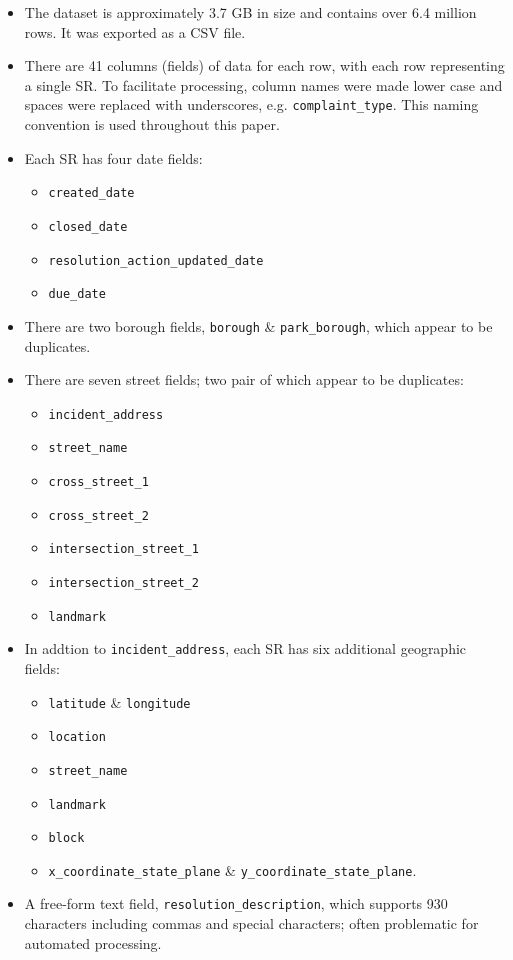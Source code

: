 \documentclass[linenumber]{jdsart}
\begin{document}
\begin{itemize}[left=1.5em]
\item The dataset is approximately 3.7 GB in size and contains 
  over 6.4 million rows. It was exported as a CSV file.

\item There are 41 columns (fields) of data for each row, with each
  row representing a single SR. To facilitate 
  processing, column names were made lower case and 
  spaces were replaced with underscores, e.g. \texttt{complaint\_type}. 
  This naming convention is used throughout this paper. 
	
\item Each SR has four date fields: 
	\begin{itemize}	
		\item{\texttt{created\_date}}
		\item{\texttt{closed\_date}}
		\item{\texttt{resolution\_action\_updated\_date}}
		\item{\texttt{due\_date}}
	\end{itemize}

\item There are two borough fields, \texttt{borough} \& \texttt{park\_borough}, 
		which appear to be duplicates.
  
\item There are seven street fields; two pair of which appear to be duplicates:
	\begin{itemize}
		\item{\texttt{incident\_address}}
		\item{\texttt{street\_name}}
		\item{\texttt{cross\_street\_1}}
		\item{\texttt{cross\_street\_2}}
		\item{\texttt{intersection\_street\_1}}
		\item{\texttt{intersection\_street\_2}}
		\item{\texttt{landmark}}
	\end{itemize}
          
\item In addtion to \texttt{incident\_address}, each SR has six
	additional geographic fields:
	\begin{itemize}
		\item{\texttt{latitude} \& \texttt{longitude}}
		\item{\texttt{location}}
		\item{\texttt{street\_name}}
		\item{\texttt{landmark}}
		\item{\texttt{block}}
		\item{\texttt{x\_coordinate\_state\_plane} \& \texttt{y\_coordinate\_state\_plane}}.
 	\end{itemize}
	
\item A free-form text field, \texttt{resolution\_description}, which 
  supports 930 characters including commas and 
  special characters; often problematic for automated processing.
\end{itemize}
\medskip
\end{document}
